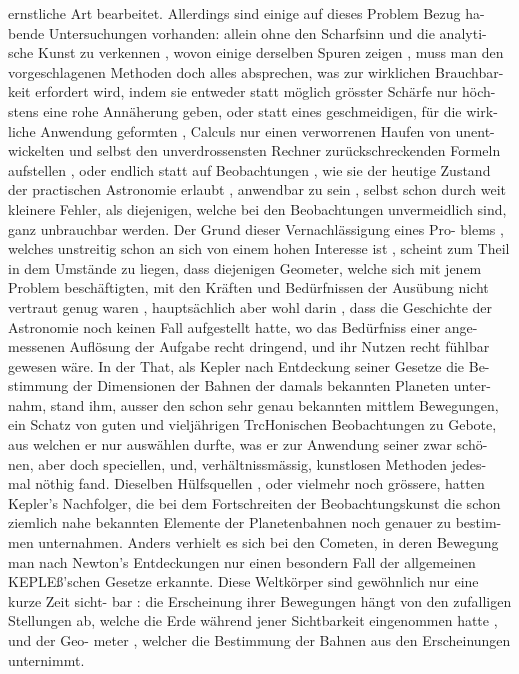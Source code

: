 \documentclass[12pt,a4paper]{article}
\begin{document}
\newpage

ernstliche  Art  bearbeitet.  Allerdings  sind  einige  auf  dieses  Problem  Bezug  ha-
bende Untersuchungen  vorhanden:  allein  ohne  den  Scharfsinn  und  die  analyti-
sche Kunst  zu  verkennen ,  wovon  einige  derselben  Spuren  zeigen ,  muss  man  den
vorgeschlagenen  Methoden  doch  alles  absprechen,  was  zur  wirklichen  Brauchbar-
keit erfordert  wird,  indem  sie  entweder  statt  möglich  grösster  Schärfe  nur  höch-
stens eine  rohe  Annäherung  geben,  oder  statt  eines  geschmeidigen,  für  die  wirk-
liche Anwendung  geformten ,  Calculs  nur  einen  verworrenen  Haufen  von  unent-
wickelten und  selbst  den  unverdrossensten  Rechner  zurückschreckenden  Formeln
aufstellen ,  oder  endlich  statt  auf  Beobachtungen ,  wie  sie  der  heutige  Zustand
der  practischen  Astronomie  erlaubt ,  anwendbar  zu  sein ,  selbst  schon  durch  weit
kleinere  Fehler,  als  diejenigen,  welche  bei  den  Beobachtungen  unvermeidlich
sind,  ganz  unbrauchbar  werden.  Der  Grund  dieser  Vernachlässigung  eines  Pro-
blems ,  welches  unstreitig  schon  an  sich  von  einem  hohen  Interesse  ist ,  scheint
zum  Theil  in  dem  Umstände  zu  liegen,  dass  diejenigen  Geometer,  welche  sich  mit
jenem  Problem  beschäftigten,  mit  den  Kräften  und  Bedürfnissen  der  Ausübung
nicht  vertraut  genug  waren ,  hauptsächlich  aber  wohl  darin ,  dass  die  Geschichte
der  Astronomie  noch  keinen  Fall  aufgestellt  hatte,  wo  das  Bedürfniss  einer  ange-
messenen Auflösung  der  Aufgabe  recht  dringend,  und  ihr  Nutzen  recht  fühlbar
gewesen  wäre.  In  der  That,  als  Kepler  nach  Entdeckung  seiner  Gesetze  die  Be-
stimmung der  Dimensionen  der  Bahnen  der  damals  bekannten  Planeten  unter-
nahm, stand  ihm,  ausser  den  schon  sehr  genau  bekannten  mittlem  Bewegungen,
ein  Schatz  von  guten  und  vieljährigen  TrcHonischen  Beobachtungen  zu  Gebote,
aus  welchen  er  nur  auswählen  durfte,  was  er  zur  Anwendung  seiner  zwar  schö-
nen, aber  doch  speciellen,  und,  verhältnissmässig,  kunstlosen  Methoden  jedes-
mal nöthig  fand.  Dieselben  Hülfsquellen ,  oder  vielmehr  noch  grössere,  hatten
Kepler's  Nachfolger,  die  bei  dem  Fortschreiten  der  Beobachtungskunst  die  schon
ziemlich  nahe  bekannten  Elemente  der  Planetenbahnen  noch  genauer  zu  bestim-
men unternahmen.
Anders  verhielt  es  sich  bei  den  Cometen,  in  deren  Bewegung  man  nach
Newton's  Entdeckungen  nur  einen  besondern  Fall  der  allgemeinen  KEPLEß'schen
Gesetze  erkannte.  Diese  Weltkörper  sind  gewöhnlich  nur  eine  kurze  Zeit  sicht-
bar :  die  Erscheinung  ihrer  Bewegungen  hängt  von  den  zufalligen  Stellungen  ab,
welche  die  Erde  während  jener  Sichtbarkeit  eingenommen  hatte ,  und  der  Geo-
meter ,  welcher  die  Bestimmung  der  Bahnen  aus  den  Erscheinungen  unternimmt.
\end{document}
